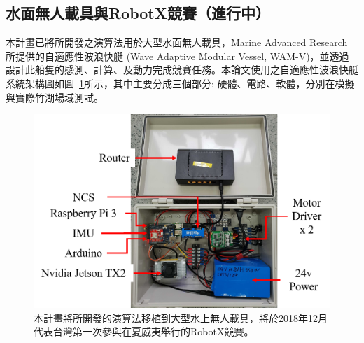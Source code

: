 \subsection{水面無人載具與RobotX競賽（進行中）}

本計畫已將所開發之演算法用於大型水面無人載具，Marine Advanced Research 所提供的自適應性波浪快艇 (Wave Adaptive Modular Vessel, WAM-V)，並透過設計此船隻的感測、計算、及動力完成競賽任務。本論文使用之自適應性波浪快艇系統架構圖如圖~\ref{figure:system_diagram}所示，其中主要分成三個部分: 硬體、電路、軟體，分別在模擬與實際竹湖場域測試。

\begin{figure}[bht]
	\centering
	\includegraphics[height=!,width=\linewidth,keepaspectratio=true]
	{images/hardware_setting.png}
	\caption{本計畫將所開發的演算法移植到大型水上無人載具，將於2018年12月代表台灣第一次參與在夏威夷舉行的RobotX競賽。}
	\label{figure:system_diagram}
\end{figure}


